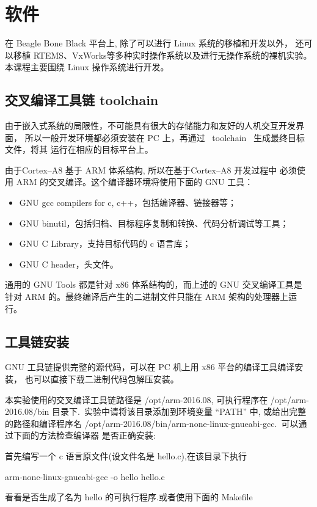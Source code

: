 \section{软件}

	在 Beagle Bone Black 平台上, 除了可以进行 Linux 系统的移植和开发以外，
还可以移植 RTEMS、VxWorks等多种实时操作系统以及进行无操作系统的裸机实验。
本课程主要围绕 Linux 操作系统进行开发。

\subsection{交叉编译工具链 toolchain}
	由于嵌入式系统的局限性，不可能具有很大的存储能力和友好的人机交互开发界面，
所以一般开发环境都必须安装在 PC 上，再通过 ~toolchain~ 生成最终目标文件，将其
运行在相应的目标平台上。

	由于Cortex--A8 基于 ARM 体系结构, 所以在基于Cortex--A8 开发过程中
必须使用 ARM 的交叉编译。这个编译器环境将使用下面的 GNU 工具：
\begin{itemize}\itemsep=-3pt
  \item GNU gcc compilers for c, c++，包括编译器、链接器等；
  \item GNU binutil，包括归档、目标程序复制和转换、代码分析调试等工具；
  \item GNU C Library，支持目标代码的 c 语言库；
  \item GNU C header，头文件。
\end{itemize}
	通用的 GNU Tools 都是针对 x86 体系结构的，而上述的 GNU 交叉编译工具是
针对 ARM 的。最终编译后产生的二进制文件只能在 ARM 架构的处理器上运行。

\subsection{工具链安装}
	GNU 工具链提供完整的源代码，可以在 PC 机上用 x86 平台的编译工具编译安装，
也可以直接下载二进制代码包解压安装。

	本实验使用的交叉编译工具链路径是 /opt/arm-2016.08, 可执行程序在
 /opt/arm-2016.08/bin 目录下.~实验中请将该目录添加到环境变量 ``PATH''
中, 或给出完整的路径和编译程序名
/opt/arm-2016.08/bin/arm-none-linux-gnueabi-gcc.~可以通过下面的方法检查编译器
是否正确安装:

    首先编写一个 c 语言原文件(设文件名是 hello.c),在该目录下执行

    arm-none-linux-gnueabi-gcc -o hello hello.c

    看看是否生成了名为 hello 的可执行程序.或者使用下面的 Makefile


